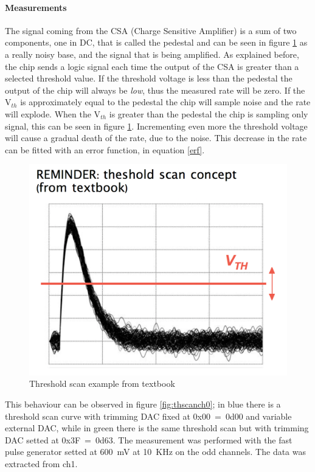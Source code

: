 \paragraph{Measurements}
\noindent
The signal coming from the CSA (Charge Sensitive Amplifier) is a sum of two components, one in DC, that is called the pedestal and can be seen in figure \ref{fig:tscansketch} as a really noisy base, and the signal that is being amplified.
As explained before, the chip sends a logic signal each time the output of the CSA is greater than a selected threshold value.
If the threshold voltage is less than the pedestal the output of the chip will always be \textit{low}, thus the measured rate will be zero.
If the V$_{th}$ is approximately equal to the pedestal the chip will sample noise and the rate will explode.
When the V$_{th}$ is greater than the pedestal the chip is sampling only signal, this can be seen in figure \ref{fig:tscansketch}.
Incrementing even more the threshold voltage will cause a gradual death of the rate, due to the noise. This decrease in the rate can be fitted with an error function, in equation \ref{erf}.
\begin{figure}[H]
	\centering
	\includegraphics[width=0.7\linewidth]{IMG/ch5/DataDacConfig/tscan_sketch}
	\caption{Threshold scan example from textbook}
	\label{fig:tscansketch}
\end{figure}
\noindent This behaviour can be observed in figure \ref{fig:thscanch0}; in blue there is a threshold scan curve with trimming DAC fixed at 0x00~=~0d00 and variable external DAC, while in green there is the same threshold scan but with trimming DAC setted at 0x3F~=~0d63.
The measurement was performed with the fast pulse generator setted at 600~mV at 10~KHz on the odd channels. The data was extracted from ch1.
